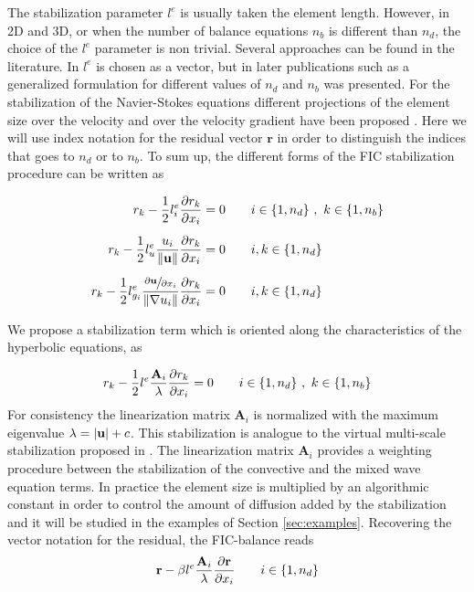 The stabilization parameter $l^e$ is usually taken the element length. However, in 2D and 3D, or when the number of balance equations $n_b$ is different than $n_d$, the choice of the $l^e$ parameter is non trivial.
Several approaches can be found in the literature. In \cite{onate1998} $l^e$ is chosen as a vector, but in later publications such as \cite{onate2001} a generalized formulation for different values of $n_d$ and $n_b$ was presented.
For the stabilization of the Navier-Stokes equations different projections of the element size over the velocity and over the velocity gradient have been proposed \cite{cotela2016}. Here we will use index notation for the residual vector $\mathbf{r}$ in order to distinguish the indices that goes to $n_d$ or to $n_b$. To sum up, the different forms of the FIC stabilization procedure can be written as

\begin{subequations}
\begin{align}
r_{k} - \frac{1}{2}l^e_i\frac{\partial r_k}{\partial x_i} &= 0
    \qquad i\in\{1,n_d\} \ ,\ k\in\{1,n_b\}\\[5pt]
r_{k} - \frac{1}{2}l^e_u\frac{u_i}{\lVert\mathbf{u}\rVert}\frac{\partial r_k}{\partial x_i} &= 0
    \qquad i,k\in\{1,n_d\}\\[5pt]
r_{k} - \frac{1}{2}l^e_{g_i}\frac{\sfrac{\partial\mathbf{u}}{\partial x_i}}{\lVert\nabla u_i\rVert}\frac{\partial r_k}{\partial x_i} &= 0
    \qquad i,k\in\{1,n_d\}
\end{align}
\end{subequations}

We propose a stabilization term which is oriented along the characteristics of the hyperbolic equations, as

\begin{equation} \label{fic_sw}
r_{k} - \frac{1}{2}l^e\frac{\mathbf{A}_i}{\lambda}\frac{\partial r_k}{\partial x_i} = 0
    \qquad i\in\{1,n_d\} \ ,\ k\in\{1,n_b\}
\end{equation}
For consistency the linearization matrix $\mathbf{A}_i$ is normalized with the maximum eigenvalue $\lambda=\lvert\mathbf{u}\rvert + c$. This stabilization is analogue to the virtual multi-scale stabilization proposed in \cite{codina2008b}. The linearization matrix $\mathbf{A}_i$ provides a weighting procedure between the stabilization of the convective and the mixed wave equation terms. In practice the element size is multiplied by an algorithmic constant in order to control the amount of diffusion added by the stabilization and it will be studied in the examples of Section \ref{sec:examples}. Recovering the vector notation for the residual, the FIC-balance reads
\begin{equation} \label{fic_sw_beta}
\mathbf{r} - \beta l^e\frac{\mathbf{A}_i}{\lambda}\frac{\partial\mathbf{r}}{\partial x_i}
    \qquad i\in\{1,n_d\}
\end{equation}


